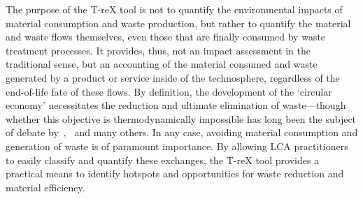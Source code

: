 The purpose of the T-reX tool is not to quantify the environmental impacts of material consumption and waste production, but rather to quantify the material and waste flows themselves, even those that are finally consumed by waste treatment processes. It provides, thus, not an impact assessment in the traditional sense, but an accounting of the material consumed and waste generated by a product or service inside of the technosphere, regardless of the end-of-life fate of these flows. By definition, the development of the `circular economy' necessitates the reduction and ultimate elimination of waste---though whether this objective is thermodynamically impossible has long been the subject of debate by~\cite{ayres1998recycling},~\cite{reuter2012recyclinglimits} and many others. In any case, avoiding material consumption and generation of waste is of paramount importance. By allowing LCA practitioners to easily classify and quantify these exchanges, the T-reX tool provides a practical means to identify hotspots and opportunities for waste reduction and material efficiency.




